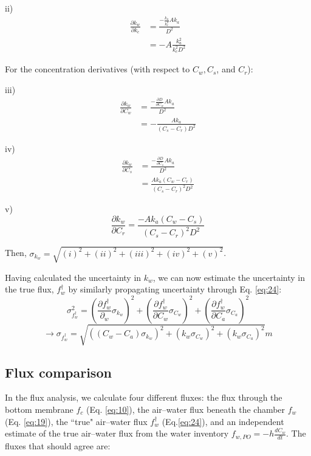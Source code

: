 \documentclass[11pt]{article}
\begin{document}
ii)
\begin{equation*}
	\begin{aligned}
	\frac{\partial k_w}{\partial k_c} 
	&= \frac{-\frac{k_a}{k_c^2} A k_a}{D^2}\\
	&= -A \frac{k_a^2}{k_c^2 D^2}
	\end{aligned}
\end{equation*}

For the concentration derivatives (with respect to $C_w, C_s$, and $C_r$):

iii)
\begin{equation*}
	\begin{aligned}
	\frac{\partial k_w}{\partial C_w} 
	&= \frac{-\frac{\partial D}{\partial C_w}Ak_a}{D^2}\\
	&= -\frac{Ak_a}{(C_s - C_r)D^2}
	\end{aligned}
\end{equation*}

iv)
\begin{equation*}
	\begin{aligned}
		\frac{\partial k_w}{\partial C_s} 
		&= \frac{-\frac{\partial D}{\partial C_s}Ak_a}{D^2}\\
		&= \frac{Ak_a(C_w-C_r)}{(C_s-C_r)^2 D^2}
	\end{aligned}
\end{equation*}

v) 
\begin{equation*}
	\frac{\partial k_w}{\partial C_r} 
		= \frac{-Ak_a(C_w-C_s)}{(C_s-C_r)^2D^2}
\end{equation*}

Then, $\sigma_{k_w} = \sqrt{(i)^2 + (ii)^2 + (iii)^2 + (iv)^2 + (v)^2}$.

Having calculated the uncertainty in $k_w$, we can now estimate the uncertainty in the true flux, $f_w^\dagger$ by similarly propagating uncertainty through Eq. \ref{eq:24}:
\begin{equation*}
		\sigma_{f_w^\dagger}^2 
		= \left(\frac{\partial f_w^\dagger}{\partial_w}\sigma_{k_w}\right)^2
		+ \left(\frac{\partial f_w^\dagger}{\partial C_w}\sigma_{C_w}\right)^2
		+ \left(\frac{\partial f_w^\dagger}{\partial C_a}\sigma_{C_a}\right)^2
\end{equation*}
\begin{equation*}
	\rightarrow \sigma_{f_w^\dagger} = \sqrt{((C_w-C_a)\sigma_{k_w})^2 + (k_w\sigma_{C_w})^2 + (k_w\sigma_{C_a})^2} m 
\end{equation*}

\subsection{Flux comparison}
In the flux analysis, we calculate four different fluxes: the flux through the bottom membrane $f_c$ (Eq. \ref{eq:10}), the air--water flux beneath the chamber $f_w$ (Eq. \ref{eq:19}), the ``true" air--water flux $f_w^\dagger$ (Eq.\ref{eq:24}), and an independent estimate of the true air--water flux from the water inventory $f_{w,PO} = -h \frac{dC_w}{dt}$. The fluxes that should agree are:
\end{document}
